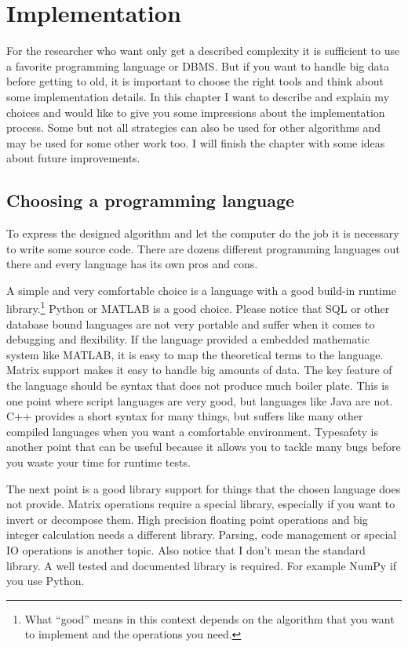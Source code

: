 \chapter{Implementation}\label{chap:implementation}
For the researcher who want only get a described complexity it is sufficient to use a favorite programming language or DBMS. But if you want to handle big data before getting to old, it is important to choose the right tools and think about some implementation details. In this chapter I want to describe and explain my choices and would like to give you some impressions about the implementation process. Some but not all strategies can also be used for other algorithms and may be used for some other work too. I will finish the chapter with some ideas about future improvements.

\section{Choosing a programming language}
To express the designed algorithm and let the computer do the job it is necessary to write some source code. There are dozens different programming languages out there and every language has its own pros and cons.

A simple and very comfortable choice is a language with a good build-in runtime library.\footnote{What ``good'' means in this context depends on the algorithm that you want to implement and the operations you need.} Python or MATLAB is a good choice. Please notice that SQL or other database bound languages are not very portable and suffer when it comes to debugging and flexibility. If the language provided a embedded mathematic system like MATLAB, it is easy to map the theoretical terms to the language. Matrix support makes it easy to handle big amounts of data. The key feature of the language should be syntax that does not produce much boiler plate. This is one point where script languages are very good, but languages like Java are not. C++ provides a short syntax for many things, but suffers like many other compiled languages when you want a comfortable environment. Typesafety is another point that can be useful because it allows you to tackle many bugs before you waste your time for runtime tests.

The next point is a good library support for things that the chosen language does not provide. Matrix operations require a special library, especially if you want to invert or decompose them. High precision floating point operations and big integer calculation needs a different library. Parsing, code management or special IO operations is another topic. Also notice that I don't mean the standard library. A well tested and documented library is required. For example NumPy if you use Python.

